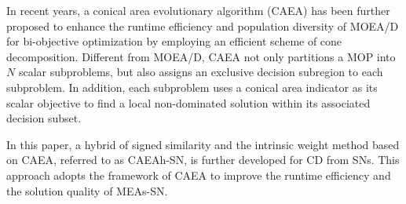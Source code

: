 \documentclass[10pt, journal]{IEEEtran}
\begin{document}
In recent years, a conical area evolutionary algorithm (CAEA) \cite{weiqin2012efficient} has been further proposed  to
enhance the runtime efficiency and population diversity of MOEA/D for bi-objective optimization by employing an efficient scheme of cone decomposition. Different from MOEA/D, CAEA not only partitions a MOP into $N$ scalar subproblems, but also assigns an exclusive decision subregion to each subproblem. In addition, each subproblem uses a conical area indicator as its scalar objective to find a local non-dominated solution within its associated decision subset.



In this paper, a hybrid of signed similarity and the intrinsic weight method based on CAEA, referred to as CAEAh-SN, is further developed for CD from SNs. This approach adopts the framework of CAEA to improve the runtime efficiency and the solution quality of MEAs-SN.

%

\end{document}
